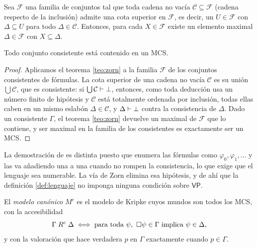 \begin{teorema}\label{teo:zorn}
Sea $\mathcal{F}$ una familia de conjuntos tal que toda cadena no vacía $\mathcal{C} \subseteq \mathcal{F}$ (cadena respecto de la inclusión) admite una cota superior en $\mathcal{F}$, es decir, un $U \in \mathcal{F}$ con $\Delta \subseteq U$ para todo $\Delta \in \mathcal{C}$. Entonces, para cada $X \in \mathcal{F}$ existe un elemento maximal $\Delta \in \mathcal{F}$ con $X \subseteq \Delta$.
\end{teorema}

\begin{lema}\label{lem:lindenbaum}
Todo conjunto consistente está contenido en un MCS.
\end{lema}
\begin{proof}
Aplicamos el teorema \ref{teo:zorn} a la familia $\mathcal{F}$ de los conjuntos consistentes de fórmulas. La cota superior de una cadena no vacía $\mathcal{C}$ es su unión $\bigcup \mathcal{C}$, que es consistente: si $\bigcup \mathcal{C} \vdash \bot$, entonces, como toda deducción usa un número finito de hipótesis y $\mathcal{C}$ está totalmente ordenada por inclusión, todas ellas caben en un mismo eslabón $\Delta \in \mathcal{C}$, y $\Delta \vdash \bot$ contra la consistencia de $\Delta$. Dado un consistente $\Gamma$, el teorema \ref{teo:zorn} devuelve un maximal de $\mathcal{F}$ que lo contiene, y ser maximal en la familia de los consistentes es exactamente ser un MCS.
\end{proof}

La demostración de \cite[Lema~4.17]{blackburn} es distinta puesto que enumera las fórmulas como $\varphi_0, \varphi_1, \dots$ y las va añadiendo una a una cuando no rompen la consistencia, lo que exige que el lenguaje sea numerable. La vía de Zorn elimina esa hipótesis, y de ahí que la definición \ref{def:lenguaje} no imponga ninguna condición sobre $\mathsf{VP}$.

\begin{definicion}\label{def:canonico}
El \emph{modelo canónico} $M^c$ es el modelo de Kripke cuyos mundos son todos los MCS, con la accesibilidad
\[
  \Gamma \mathrel{R^c} \Delta \iff \text{para toda } \psi,\ \square\psi \in \Gamma \text{ implica } \psi \in \Delta,
\]
y con la valoración que hace verdadera $p$ en $\Gamma$ exactamente cuando $p \in \Gamma$.
\end{definicion}


